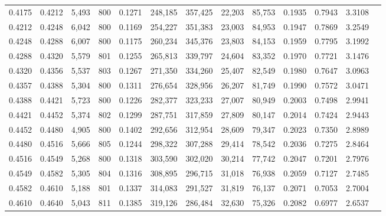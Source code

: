 \begin{tabular}{rrrrrrrrrrrrr}
0.4175 & 0.4212 &  5,493 & 800 &                                     0.1271 & 248,185 & 357,425 &  22,203 &  85,753 & 0.1935 & 0.7943 & 3.3108 \\
0.4212 & 0.4248 &  6,042 & 800 &                                     0.1169 & 254,227 & 351,383 &  23,003 &  84,953 & 0.1947 & 0.7869 & 3.2549 \\
0.4248 & 0.4288 &  6,007 & 800 &                                     0.1175 & 260,234 & 345,376 &  23,803 &  84,153 & 0.1959 & 0.7795 & 3.1992 \\
0.4288 & 0.4320 &  5,579 & 801 &                                     0.1255 & 265,813 & 339,797 &  24,604 &  83,352 & 0.1970 & 0.7721 & 3.1476 \\
0.4320 & 0.4356 &  5,537 & 803 &                                     0.1267 & 271,350 & 334,260 &  25,407 &  82,549 & 0.1980 & 0.7647 & 3.0963 \\
0.4357 & 0.4388 &  5,304 & 800 &                                     0.1311 & 276,654 & 328,956 &  26,207 &  81,749 & 0.1990 & 0.7572 & 3.0471 \\
0.4388 & 0.4421 &  5,723 & 800 &                                     0.1226 & 282,377 & 323,233 &  27,007 &  80,949 & 0.2003 & 0.7498 & 2.9941 \\
0.4421 & 0.4452 &  5,374 & 802 &                                     0.1299 & 287,751 & 317,859 &  27,809 &  80,147 & 0.2014 & 0.7424 & 2.9443 \\
0.4452 & 0.4480 &  4,905 & 800 &                                     0.1402 & 292,656 & 312,954 &  28,609 &  79,347 & 0.2023 & 0.7350 & 2.8989 \\
0.4480 & 0.4516 &  5,666 & 805 &                                     0.1244 & 298,322 & 307,288 &  29,414 &  78,542 & 0.2036 & 0.7275 & 2.8464 \\
0.4516 & 0.4549 &  5,268 & 800 &                                     0.1318 & 303,590 & 302,020 &  30,214 &  77,742 & 0.2047 & 0.7201 & 2.7976 \\
0.4549 & 0.4582 &  5,305 & 804 &                                     0.1316 & 308,895 & 296,715 &  31,018 &  76,938 & 0.2059 & 0.7127 & 2.7485 \\
0.4582 & 0.4610 &  5,188 & 801 &                                     0.1337 & 314,083 & 291,527 &  31,819 &  76,137 & 0.2071 & 0.7053 & 2.7004 \\
0.4610 & 0.4640 &  5,043 & 811 &                                     0.1385 & 319,126 & 286,484 &  32,630 &  75,326 & 0.2082 & 0.6977 & 2.6537 \\

\end{tabular}
